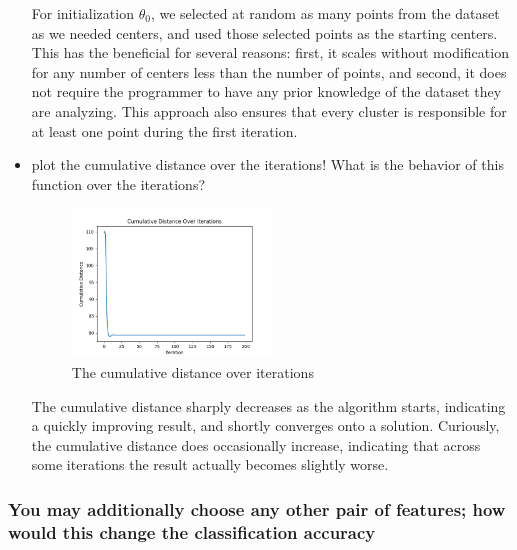 \documentclass[a4paper]{article}
\begin{document}
\begin{itemize}
	For initialization $\theta_0$, we selected at random as many points from the dataset as we needed centers, and used those selected points as the starting centers.  This has the beneficial for several reasons: first, it scales without modification for any number of centers less than the number of points, and second, it does not require the programmer to have any prior knowledge of the dataset they are analyzing.  This approach also ensures that every cluster is responsible for at least one point during the first iteration.

	\clearpage
	\item plot the cumulative distance over the iterations! What is the behavior of this function over the iterations?

	\begin{figure}[h]
		\begin{center}
			\includegraphics[width=0.5\textwidth]{kmeans_convergence.png}
			\caption{The cumulative distance over iterations}
		\end{center}
	\end{figure}
	The cumulative distance sharply decreases as the algorithm starts, indicating a quickly improving result, and shortly converges onto a solution.  Curiously, the cumulative distance does occasionally increase, indicating that across some iterations the result actually becomes slightly worse.\\

	\end{itemize}

	\clearpage

	\subsubsection{You may additionally choose any other pair of features; how would this change the classiﬁcation accuracy}
\end{document}
